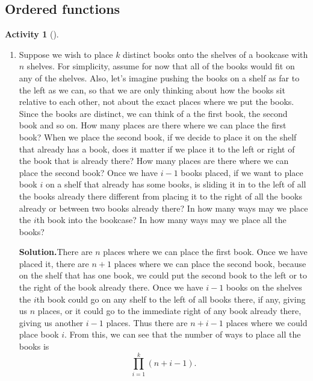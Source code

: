 \documentclass[10pt,]{book}
\theoremstyle{plain}
\theoremstyle{definition}
\newtheorem{activity}[project]{Activity}
\numberwithin{equation}{chapter}
\begin{document}
\subsection[{Ordered functions}]{Ordered functions}\label{orderedfunctionsection}
\begin{activity}[]\label{bookcase}
~\par
\begin{enumerate}[label=(\alph*)]
 \item Suppose we wish to place \(k\) distinct books onto the shelves of a bookcase with \(n\) shelves. For simplicity, assume for now that all of the books would fit on any of the shelves. Also, let's imagine pushing the books on a shelf as far to the left as we can, so that we are only thinking about how the books sit relative to each other, not about the exact places where we put the books. Since the books are distinct, we can think of a the first book, the second book and so on. How many places are there where we can place the first book? When we place the second book, if we decide to place it on the shelf that already has a book, does it matter if we place it to the left or right of the book that is already there? How many places are there where we can place the second book? Once we have \(i-1\) books placed, if we want to place book \(i\) on a shelf that already has some books, is sliding it in to the left of all the books already there different from placing it to the right of all the books already or between two books already there? In how many ways may we place the \(i\)th book into the bookcase? In how many ways may we place all the books?%
\par\medskip\noindent%
\textbf{Solution.}\quad There are \(n\) places where we can place the first book. Once we have placed it, there are \(n+1\) places where we can place the second book, because on the shelf that has one book, we could put the second book to the left or to the right of the book already there. Once we have \(i-1\) books on the shelves the \(i\)th book could go on any shelf to the left of all books there, if any, giving us \(n\) places, or it could go to the immediate right of any book already there, giving us another \(i-1\) places. Thus there are \(n+i-1\) places where we could place book \(i\). From this, we can see that the number of ways to place all the books is%
\begin{equation*}
\prod_{i=1}^k (n+i-1).
\end{equation*}
%


\end{enumerate}
\end{activity}
\end{document}
